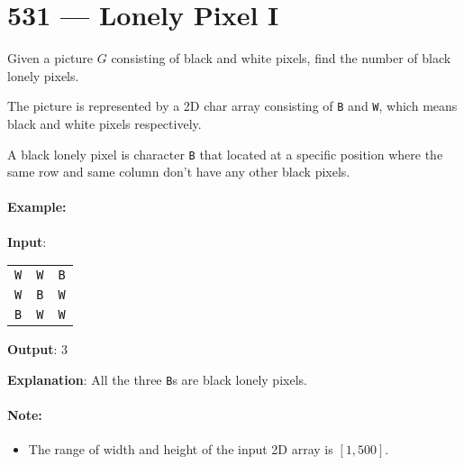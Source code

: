 \section{531 --- Lonely Pixel I}
Given a picture $G$ consisting of black and white pixels, find the number of black lonely pixels.

The picture is represented by a 2D char array consisting of \texttt{B} and \texttt{W}, which means black and white pixels respectively.

A black lonely pixel is character \texttt{B} that located at a specific position where the same row and same column don't have any other black pixels.

\paragraph{Example:}

\begin{flushleft}
\textbf{Input}: 

\begin{table}[H]
\begin{tabular}{ccc}
\texttt{W} & \texttt{W} & \texttt{B}\\
 \texttt{W} & \texttt{B} & \texttt{W}\\
 \texttt{B} & \texttt{W} & \texttt{W}
\end{tabular}
\end{table}


\textbf{Output}: 3

\textbf{Explanation}: All the three \texttt{B}s are black lonely pixels.
\end{flushleft}

\paragraph{Note:}

\begin{itemize}
\item  The range of width and height of the input 2D array is $ [1,500] $.
\end{itemize}
